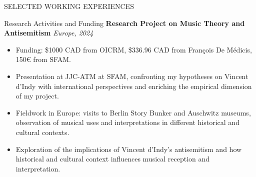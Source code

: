 \documentclass{resume} %
\begin{document}
\begin{rSection}{SELECTED WORKING EXPERIENCES}



\end{rSection} 



\begin{rSection}{Research Activities and Funding}
\vspace{-0.25em}
\textbf{Research Project on Music Theory and Antisemitism} \hfill \textit{Europe, 2024}
\vspace{-0.25em}
\begin{itemize}
    \itemsep -3pt {}
    \item Funding: \$1000 CAD from OICRM, \$336.96 CAD from François De Médicis, 150€ from SFAM.
    \item Presentation at JJC-ATM at SFAM, confronting my hypotheses on Vincent d'Indy with international perspectives and enriching the empirical dimension of my project.
    \item Fieldwork in Europe: visits to Berlin Story Bunker and Auschwitz museums, observation of musical uses and interpretations in different historical and cultural contexts.
    \item Exploration of the implications of Vincent d'Indy's antisemitism and how historical and cultural context influences musical reception and interpretation.
\end{itemize}

\end{rSection}
\end{document}
